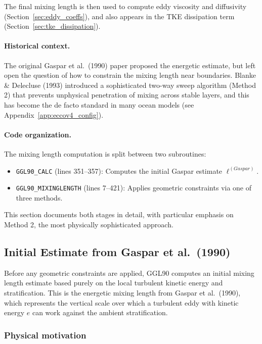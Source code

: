\documentclass[12pt,letterpaper]{article}
\begin{document}
The final mixing length is then used to compute eddy viscosity and diffusivity (Section~\ref{sec:eddy_coeffs}), and also appears in the TKE dissipation term (Section~\ref{sec:tke_dissipation}).

\paragraph{Historical context.} The original Gaspar et al.\ (1990) paper proposed the energetic estimate, but left open the question of how to constrain the mixing length near boundaries. Blanke \& Delecluse (1993) introduced a sophisticated two-way sweep algorithm (Method 2) that prevents unphysical penetration of mixing across stable layers, and this has become the de facto standard in many ocean models (see Appendix~\ref{app:eccov4_config}).

\paragraph{Code organization.} The mixing length computation is split between two subroutines:
\begin{itemize}
\item \verb|GGL90_CALC| (lines 351--357): Computes the initial Gaspar estimate $\ell^{(Gaspar)}$.
\item \verb|GGL90_MIXINGLENGTH| (lines 7--421): Applies geometric constraints via one of three methods.
\end{itemize}

This section documents both stages in detail, with particular emphasis on Method 2, the most physically sophisticated approach.

\subsection{Initial Estimate from Gaspar et al.\ (1990)}
\label{sec:mxl_gaspar}

Before any geometric constraints are applied, GGL90 computes an initial mixing length estimate based purely on the local turbulent kinetic energy and stratification. This is the energetic mixing length from Gaspar et al.\ (1990), which represents the vertical scale over which a turbulent eddy with kinetic energy $e$ can work against the ambient stratification.

\subsubsection{Physical motivation}
\end{document}
